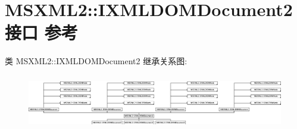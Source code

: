 \hypertarget{interface_m_s_x_m_l2_1_1_i_x_m_l_d_o_m_document2}{}\section{M\+S\+X\+M\+L2\+:\+:I\+X\+M\+L\+D\+O\+M\+Document2接口 参考}
\label{interface_m_s_x_m_l2_1_1_i_x_m_l_d_o_m_document2}
类 M\+S\+X\+M\+L2\+:\+:I\+X\+M\+L\+D\+O\+M\+Document2 继承关系图\+:\begin{figure}[H]
\begin{center}
\leavevmode
\includegraphics[height=2.425742cm]{interface_m_s_x_m_l2_1_1_i_x_m_l_d_o_m_document2}
\end{center}
\end{figure}
